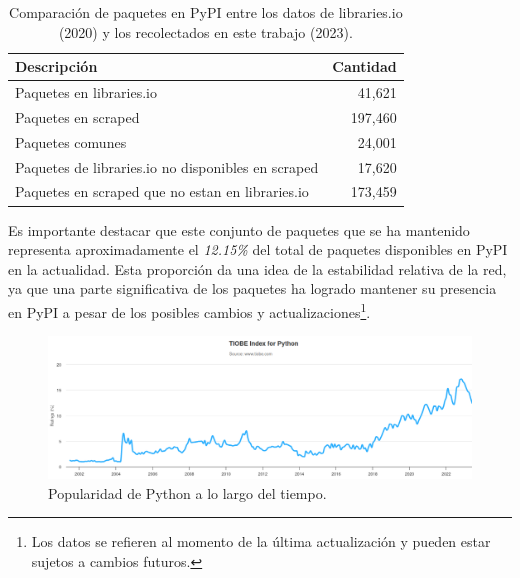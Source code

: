 \begin{table}[ht!]
    \begin{center}
        \begin{tabular}{|l|r|}
            \hline
            \textbf{Descripción}                               & \textbf{Cantidad} \\
            \hline
            Paquetes en libraries.io                           & 41,621            \\
            Paquetes en scraped                                & 197,460           \\
            Paquetes comunes                                   & 24,001            \\
            Paquetes de libraries.io no disponibles en scraped & 17,620            \\
            Paquetes en scraped que no estan en libraries.io   & 173,459           \\
            \hline
        \end{tabular}
    \end{center}
    \label{tab:pypi_common_packages}
    \caption{Comparación de paquetes en PyPI entre los datos de libraries.io (2020) y los recolectados en este trabajo (2023).}
\end{table}

Es importante destacar que este conjunto de paquetes que se ha mantenido representa aproximadamente
el \textit{12.15\%} del total de paquetes disponibles en PyPI en la actualidad. Esta proporción
da una idea de la estabilidad relativa de la red, ya que una parte significativa de los
paquetes ha logrado mantener su presencia en PyPI a pesar de los posibles cambios y
actualizaciones\footnote{Los datos se refieren al momento de la última actualización y pueden estar
    sujetos a cambios futuros.}.

\begin{figure}[ht!]
    \begin{center}
        \includegraphics[width=1\textwidth]{img/pypi/pypi_popularity.png}
        \caption{Popularidad de Python a lo largo del tiempo.}
        \label{fig:pypi_popularity}
    \end{center}
\end{figure}


